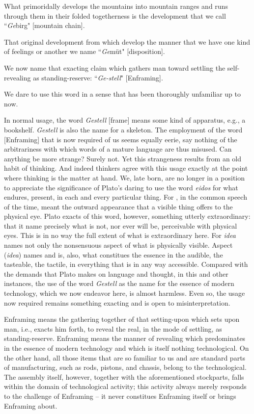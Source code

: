 What primoridally develops the mountains into mountain ranges and runs through them in their folded togetherness is the development that we call ``\textit{Ge}birg" [mountain chain].

That original development from which develop the manner that we have one kind of feelings or another we name ``\textit{Ge}m\"{u}t" [disposition].

We now name that exacting claim which gathers man toward settling the self-revealing as standing-reserve: ``\textit{Ge-stell}" [Enframing].

We dare to use this word in a sense that has been thoroughly unfamiliar up to now.

In normal usage, the word \textit{Gestell} [frame] means some kind of apparatus, e.g., a bookshelf. \textit{Gestell} is also the name for a skeleton. The employment of the word  [Enframing] that is now required of us seems equally eerie, say nothing of the arbitrariness with which words of a mature language are thus misused. Can anything be more strange? Surely not. Yet this strangeness results from an old habit of thinking. And indeed thinkers agree with this usage exactly at the point where thinking is the matter at hand.  We, late born, are no longer in a position to appreciate the significance of Plato's daring to use the word \textit{eidos} for what endures, present, in each and every particular thing. For , in the common speech of the time, meant the outward appearance that a visible thing offers to the physical eye. Plato exacts of this word, however, something utterly extraordinary: that it name precisely what is not, nor ever will be, perceivable with physical eyes. This is in no way the full extent of what is extraordinary here. For \textit{idea} names not only the nonsensuous aspect of what is physically visible. Aspect (\textit{idea}) names and is, also, what constitues the essence in the audible, the tasteable, the tactile, in everything that is in any way accessible. Compared with the demands that Plato makes on language and thought, in this and other instances, the use of the word \textit{Gestell} as the name for the essence of modern technology, which we now endeavor here, is almost harmless. Even so, the usage now required remains something exacting and is open to misinterpretation.

Enframing means the gathering together of that setting-upon which sets upon man, i.e., exacts him forth, to reveal the real, in the mode of settling, as standing-reserve. Enframing means the manner of revealing which predominates in the essence of modern technology and which is itself nothing technological. On the other hand, all those items that are so familiar to us and are standard parts of manufacturing, such as rods, pistons, and chassis, belong to the technological. The assembly itself, however, together with the aforementioned stockparts, falls within the domain of technological activity; this activity always merely responds to the challenge of Enframing -- it never constitues Enframing itself or brings Enframing about.

